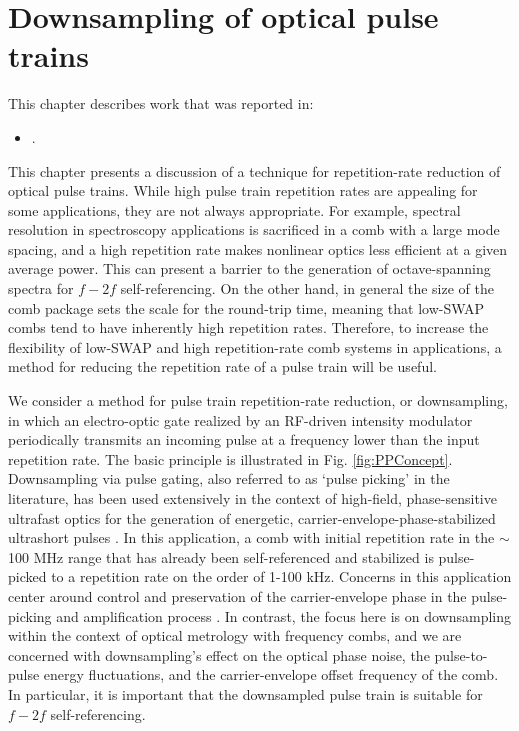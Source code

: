  \chapter{Downsampling of optical pulse trains} \label{chap:PulsePicking}
    \begin{footnotesize}
 	\begin{spacing}{1.2}
 		This chapter describes work that was reported in:
 		\begin{itemize}
 			\item {}.\\
 		\end{itemize}
 	\end{spacing}
 \end{footnotesize}
 

This chapter presents a discussion of a technique for repetition-rate reduction of optical pulse trains. While high pulse train repetition rates are appealing for some applications, they are not always appropriate. For example, spectral resolution in spectroscopy applications is sacrificed in a comb with a large mode spacing, and a high repetition rate makes nonlinear optics less efficient at a given average power. This can present a barrier to the generation of octave-spanning spectra for $f-2f$ self-referencing. On the other hand, in general the size of the comb package sets the scale for the round-trip time, meaning that low-SWAP combs tend to have inherently high repetition rates. Therefore, to increase the flexibility of low-SWAP and high repetition-rate comb systems in applications, a method for reducing the repetition rate of a pulse train will be useful.

We consider a method for pulse train repetition-rate reduction, or downsampling, in which an electro-optic gate realized by an RF-driven intensity modulator periodically transmits an incoming pulse at a frequency lower than the input repetition rate. The basic principle is illustrated in Fig. \ref{fig:PPConcept}. Downsampling via pulse gating, also referred to as `pulse picking' in the literature, has been used extensively in the context of high-field, phase-sensitive ultrafast optics for the generation of energetic, carrier-envelope-phase-stabilized ultrashort pulses \cite{Backus1998,Baltuska2003}. In this application, a comb with initial repetition rate in the $\sim$100 MHz range that has already been self-referenced and stabilized is pulse-picked to a repetition rate on the order of 1-100 kHz. Concerns in this application center around control and preservation of the carrier-envelope phase in the pulse-picking and amplification process \cite{Gohle2005,Rauschenberger2006}. In contrast, the focus here is on downsampling within the context of optical metrology with frequency combs, and we are concerned with downsampling's effect on the optical phase noise, the pulse-to-pulse energy fluctuations, and the carrier-envelope offset frequency of the comb. In particular, it is important that the downsampled pulse train is suitable for $f-2f$ self-referencing. 

